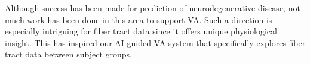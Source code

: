 Although success has been made for prediction of  neurodegenerative disease, not much work has been done in this area to support VA. Such a direction is especially intriguing for fiber tract data since it offers unique physiological insight.%
This has inspired our AI guided VA system that specifically explores fiber tract data between subject groups. 




        
